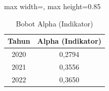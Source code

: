 \begin{table}[H]
\centering
\caption{Bobot Alpha (Indikator)} \label{tab:samplealpha_s}
\begin{adjustbox}{max width=\textwidth, max height=0.85\textheight}
\begin{tabular}{|c|c|}
\hline
\textbf{Tahun} & \textbf{Alpha (Indikator)} \\
\hline
2020 & 0,2794 \\
2021 & 0,3556 \\
2022 & 0,3650 \\
\hline
\end{tabular}
\end{adjustbox}
\end{table}